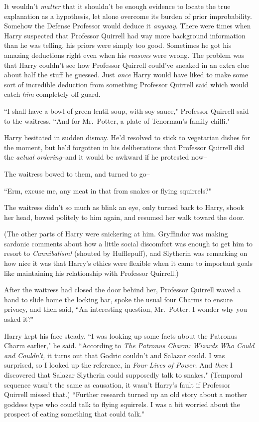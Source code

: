 It wouldn't \emph{matter} that it shouldn't be enough evidence to locate the true explanation as a hypothesis, let alone overcome its burden of prior improbability. Somehow the Defense Professor would deduce it \emph{anyway}. There were times when Harry suspected that Professor Quirrell had way more background information than he was telling, his priors were simply too good. Sometimes he got his amazing deductions right even when his \emph{reasons} were wrong. The problem was that Harry couldn't see how Professor Quirrell could've sneaked in an extra clue about half the stuff he guessed. Just \emph{once} Harry would have liked to make some sort of incredible deduction from something Professor Quirrell said which would catch \emph{him} completely off guard.

\later

``I shall have a bowl of green lentil soup, with soy sauce," Professor Quirrell said to the waitress. ``And for Mr.~Potter, a plate of Tenorman's family chilli."

Harry hesitated in sudden dismay. He'd resolved to stick to vegetarian dishes for the moment, but he'd forgotten in his deliberations that Professor Quirrell did the \emph{actual ordering}\---and it would be awkward if he protested now\---

The waitress bowed to them, and turned to go\---

``Erm, excuse me, any meat in that from snakes or flying squirrels?"

The waitress didn't so much as blink an eye, only turned back to Harry, shook her head, bowed politely to him again, and resumed her walk toward the door.

(The other parts of Harry were snickering at him. Gryffindor was making sardonic comments about how a little social discomfort was enough to get him to resort to \emph{Cannibalism!} (shouted by Hufflepuff), and Slytherin was remarking on how nice it was that Harry's ethics were flexible when it came to important goals like maintaining his relationship with Professor Quirrell.)

After the waitress had closed the door behind her, Professor Quirrell waved a hand to slide home the locking bar, spoke the usual four Charms to ensure privacy, and then said, ``An interesting question, Mr.~Potter. I wonder why you asked it?"

Harry kept his face steady. ``I was looking up some facts about the Patronus Charm earlier," he said. ``According to \emph{The Patronus Charm: Wizards Who Could and Couldn't,} it turns out that Godric couldn't and Salazar could. I was surprised, so I looked up the reference, in \emph{Four Lives of Power.} And \emph{then} I discovered that Salazar Slytherin could supposedly talk to snakes." (Temporal sequence wasn't the same as causation, it wasn't Harry's fault if Professor Quirrell missed that.) ``Further research turned up an old story about a mother goddess type who could talk to flying squirrels. I was a bit worried about the prospect of eating something that could talk."

